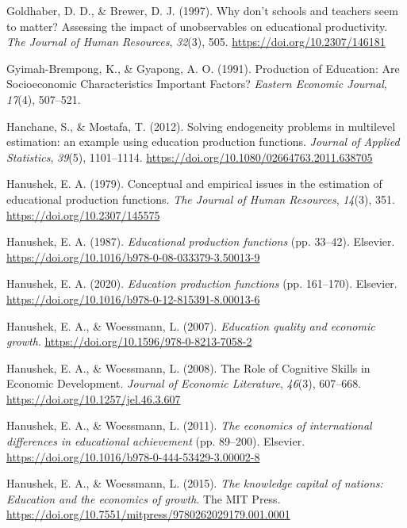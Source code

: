 \documentclass[
]{article}
\newlength{\cslhangindent}
\newenvironment{CSLReferences}[2] %
 {\begin{list}{}{%
  \setlength{\itemindent}{0pt}
  \setlength{\leftmargin}{0pt}
  \setlength{\parsep}{0pt}
  \ifodd #1
   \setlength{\leftmargin}{\cslhangindent}
   \setlength{\itemindent}{-1\cslhangindent}
  \fi
  \setlength{\itemsep}{#2\baselineskip}}}
 {\end{list}}
\begin{document}
\begin{CSLReferences}{1}{0}
Goldhaber, D. D., \& Brewer, D. J. (1997). Why don't schools and
teachers seem to matter? Assessing the impact of unobservables on
educational productivity. \emph{The Journal of Human Resources},
\emph{32}(3), 505. \url{https://doi.org/10.2307/146181}

Gyimah-Brempong, K., \& Gyapong, A. O. (1991). Production of Education:
Are Socioeconomic Characteristics Important Factors? \emph{Eastern
Economic Journal}, \emph{17}(4), 507--521.

Hanchane, S., \& Mostafa, T. (2012). Solving endogeneity problems in
multilevel estimation: an example using education production functions.
\emph{Journal of Applied Statistics}, \emph{39}(5), 1101--1114.
\url{https://doi.org/10.1080/02664763.2011.638705}

Hanushek, E. A. (1979). Conceptual and empirical issues in the
estimation of educational production functions. \emph{The Journal of
Human Resources}, \emph{14}(3), 351.
\url{https://doi.org/10.2307/145575}

Hanushek, E. A. (1987). \emph{Educational production functions} (pp.
33--42). Elsevier.
\url{https://doi.org/10.1016/b978-0-08-033379-3.50013-9}

Hanushek, E. A. (2020). \emph{Education production functions} (pp.
161--170). Elsevier.
\url{https://doi.org/10.1016/b978-0-12-815391-8.00013-6}

Hanushek, E. A., \& Woessmann, L. (2007). \emph{Education quality and
economic growth}. \url{https://doi.org/10.1596/978-0-8213-7058-2}

Hanushek, E. A., \& Woessmann, L. (2008). The Role of Cognitive Skills
in Economic Development. \emph{Journal of Economic Literature},
\emph{46}(3), 607--668. \url{https://doi.org/10.1257/jel.46.3.607}

Hanushek, E. A., \& Woessmann, L. (2011). \emph{The economics of
international differences in educational achievement} (pp. 89--200).
Elsevier. \url{https://doi.org/10.1016/b978-0-444-53429-3.00002-8}

Hanushek, E. A., \& Woessmann, L. (2015). \emph{The knowledge capital of
nations: Education and the economics of growth}. The MIT Press.
\url{https://doi.org/10.7551/mitpress/9780262029179.001.0001}


\end{CSLReferences}
\end{document}
